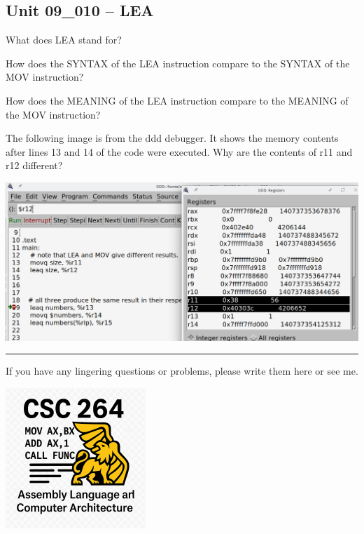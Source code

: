\documentclass[letterpaper,12pt]{exam}
\newcommand{\unit}{Unit 09}
\begin{document}

\par{\selectfont\textbf{}}
\begin{questions}

\section*{\unit\_010 -- LEA }
\begin{samepage}
    \question What does LEA stand for?
    \vspace{5mm}
\end{samepage}
\par
\begin{samepage}
    \question How does the SYNTAX of the LEA instruction compare to the SYNTAX of the MOV instruction?
    \vspace{5mm}
\end{samepage}
\begin{samepage}
    \question How does the MEANING of the LEA instruction compare to the MEANING of the MOV instruction?
    \vspace{5mm}
\end{samepage}
\par
\begin{samepage}
    \question The following image is from the ddd debugger.  It shows the memory contents after lines 13 and 14 of the code were executed.  Why are the contents of r11 and r12 different?
   \begin{center}
    \includegraphics{../../09_Stack/images/010_LeaVsMov.png}
   \end{center}
   \vspace{5mm}
\end{samepage}
\par
  
\end{questions} 
\begin{center}
    \rule{0.667\textwidth}{.8pt} %
\end{center}


If you have any lingering questions or problems, please write them here or see me.
\vfill
\begin{center}
\includegraphics{../csc264Logo}
\end{center}
\end{document}
